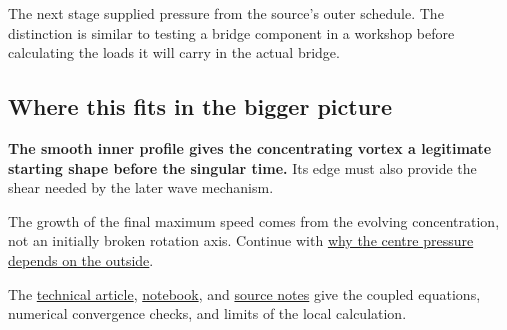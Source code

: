 \documentclass[
  english,
  11pt,
]{article}
\begin{document}
The next stage supplied pressure from the source's outer schedule. The
distinction is similar to testing a bridge component in a workshop
before calculating the loads it will carry in the actual bridge.

\subsection{Where this fits in the bigger
picture}\label{where-this-fits-in-the-bigger-picture}

\textbf{The smooth inner profile gives the concentrating vortex a
legitimate starting shape before the singular time.} Its edge must also
provide the shear needed by the later wave mechanism.

The growth of the final maximum speed comes from the evolving
concentration, not an initially broken rotation axis. Continue with
\href{../d6_axis_pressure/article.html}{why the centre pressure depends
on the outside}.

The \href{technical-article.html}{technical article},
\href{../../code/d6_inner_profile/study.ipynb}{notebook}, and
\href{source-notes.md}{source notes} give the coupled equations,
numerical convergence checks, and limits of the local calculation.
\end{document}
